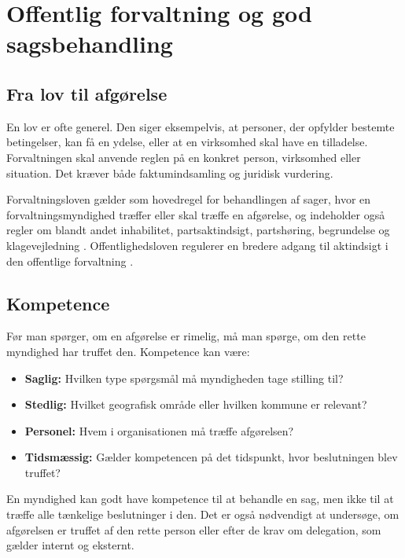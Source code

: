 \chapter{Offentlig forvaltning og god sagsbehandling}


\section{Fra lov til afgørelse}

En lov er ofte generel. Den siger eksempelvis, at personer, der opfylder bestemte betingelser, kan få en ydelse, eller at en virksomhed skal have en tilladelse. Forvaltningen skal anvende reglen på en konkret person, virksomhed eller situation. Det kræver både faktumindsamling og juridisk vurdering.

Forvaltningsloven gælder som hovedregel for behandlingen af sager, hvor en forvaltningsmyndighed træffer eller skal træffe en afgørelse, og indeholder også regler om blandt andet inhabilitet, partsaktindsigt, partshøring, begrundelse og klagevejledning \citep{forvaltningsloven}. Offentlighedsloven regulerer en bredere adgang til aktindsigt i den offentlige forvaltning \citep{offentlighedsloven}.

\section{Kompetence}

Før man spørger, om en afgørelse er rimelig, må man spørge, om den rette myndighed har truffet den. Kompetence kan være:
\begin{itemize}
  \item \textbf{Saglig:} Hvilken type spørgsmål må myndigheden tage stilling til?
  \item \textbf{Stedlig:} Hvilket geografisk område eller hvilken kommune er relevant?
  \item \textbf{Personel:} Hvem i organisationen må træffe afgørelsen?
  \item \textbf{Tidsmæssig:} Gælder kompetencen på det tidspunkt, hvor beslutningen blev truffet?
\end{itemize}

En myndighed kan godt have kompetence til at behandle en sag, men ikke til at træffe alle tænkelige beslutninger i den. Det er også nødvendigt at undersøge, om afgørelsen er truffet af den rette person eller efter de krav om delegation, som gælder internt og eksternt.

